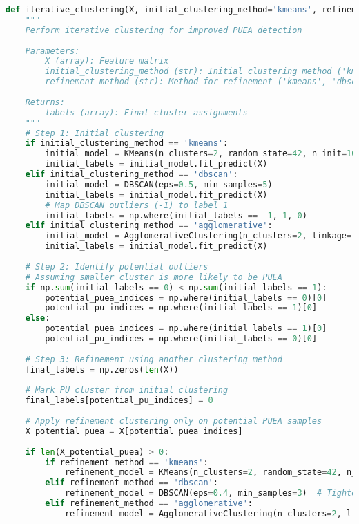 \begin{lstlisting}[language=Python, caption=Iterative Clustering Method]
def iterative_clustering(X, initial_clustering_method='kmeans', refinement_method='dbscan'):
    """
    Perform iterative clustering for improved PUEA detection
    
    Parameters:
        X (array): Feature matrix
        initial_clustering_method (str): Initial clustering method ('kmeans', 'dbscan', or 'agglomerative')
        refinement_method (str): Method for refinement ('kmeans', 'dbscan', or 'agglomerative')
    
    Returns:
        labels (array): Final cluster assignments
    """
    # Step 1: Initial clustering
    if initial_clustering_method == 'kmeans':
        initial_model = KMeans(n_clusters=2, random_state=42, n_init=10)
        initial_labels = initial_model.fit_predict(X)
    elif initial_clustering_method == 'dbscan':
        initial_model = DBSCAN(eps=0.5, min_samples=5)
        initial_labels = initial_model.fit_predict(X)
        # Map DBSCAN outliers (-1) to label 1
        initial_labels = np.where(initial_labels == -1, 1, 0)
    elif initial_clustering_method == 'agglomerative':
        initial_model = AgglomerativeClustering(n_clusters=2, linkage='ward')
        initial_labels = initial_model.fit_predict(X)
    
    # Step 2: Identify potential outliers
    # Assuming smaller cluster is more likely to be PUEA
    if np.sum(initial_labels == 0) < np.sum(initial_labels == 1):
        potential_puea_indices = np.where(initial_labels == 0)[0]
        potential_pu_indices = np.where(initial_labels == 1)[0]
    else:
        potential_puea_indices = np.where(initial_labels == 1)[0]
        potential_pu_indices = np.where(initial_labels == 0)[0]
    
    # Step 3: Refinement using another clustering method
    final_labels = np.zeros(len(X))
    
    # Mark PU cluster from initial clustering
    final_labels[potential_pu_indices] = 0
    
    # Apply refinement clustering only on potential PUEA samples
    X_potential_puea = X[potential_puea_indices]
    
    if len(X_potential_puea) > 0:
        if refinement_method == 'kmeans':
            refinement_model = KMeans(n_clusters=2, random_state=42, n_init=10)
        elif refinement_method == 'dbscan':
            refinement_model = DBSCAN(eps=0.4, min_samples=3)  # Tighter parameters for refinement
        elif refinement_method == 'agglomerative':
            refinement_model = AgglomerativeClustering(n_clusters=2, linkage='ward')
        

\end{lstlisting}
